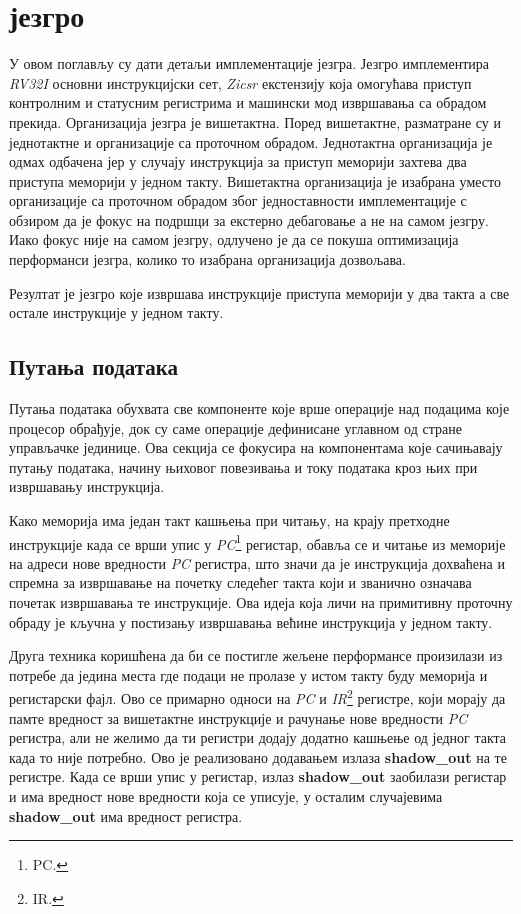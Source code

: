 \chapter{ језгро}

У овом поглављу су дати детаљи имплементације  језгра. Језгро имплементира \textit{RV32I} основни инструкцијски сет, \textit{Zicsr} екстензију која омогућава приступ контролним и статусним регистрима и машински мод извршавања са обрадом прекида.
Организација језгра је вишетактна. Поред вишетактне, разматране су и једнотактне и организације са проточном обрадом. Једнотактна организација је одмах одбачена јер у случају инструкција за приступ меморији захтева два приступа меморији у једном такту. Вишетактна организација је изабрана уместо организације са проточном обрадом због једноставности имплементације с обзиром да је фокус на подршци за екстерно дебаговање а не на самом језгру.
Иако фокус није на самом језгру, одлучено је да се покуша оптимизација перформанси језгра, колико то изабрана организација дозвољава.

Резултат је језгро које извршава инструкције приступа меморији у два такта а све остале инструкције у једном такту.

\section{Путања података}

Путања података обухвата све компоненте које врше операције над подацима које процесор обрађује, док су саме операције дефинисане углавном од стране управљачке јединице. Ова секција се фокусира на компонентама које сачињавају путању података, начину њиховог повезивања и току података кроз њих при извршавању инструкција.

Како меморија има један такт кашњења при читању, на крају претходне инструкције када се врши упис у \textit{\acrshort{PC}}\footnote{\acrfull{PC}.} регистар, обавља се и читање из меморије на адреси нове вредности \textit{\acrshort{PC}} регистра, што значи да је инструкција дохваћена и спремна за извршавање на почетку следећег такта који и званично означава почетак извршавања те инструкције. Ова идеја која личи на примитивну проточну обраду је кључна у постизању извршавања већине инструкција у једном такту.

Друга техника коришћена да би се постигле жељене перформансе произилази из потребе да једина места где подаци не пролазе у истом такту буду меморија и регистарски фајл. Ово се примарно односи на \textit{\acrshort{PC}} и \textit{\acrshort{IR}}\footnote{\acrfull{IR}.} регистре, који морају да памте вредност за вишетактне инструкције и рачунање нове вредности \textit{\acrshort{PC}} регистра, али не желимо да ти регистри додају додатно кашњење од једног такта када то није потребно. Ово је реализовано додавањем излаза \textbf{shadow\_out} на те регистре. Када се врши упис у регистар, излаз \textbf{shadow\_out} заобилази регистар и има вредност нове вредности која се уписује, у осталим случајевима \textbf{shadow\_out} има вредност регистра.

